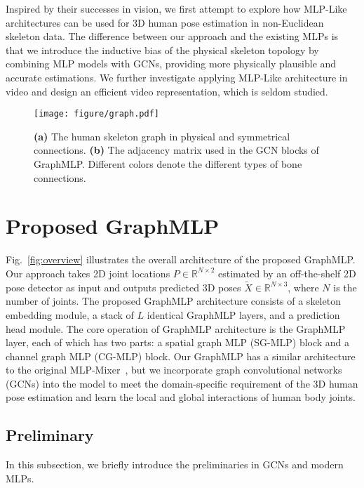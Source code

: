 \documentclass[lettersize,journal]{IEEEtran}
\begin{document}
Inspired by their successes in vision, we first attempt to explore how MLP-Like architectures can be used for 3D human pose estimation in non-Euclidean skeleton data. 
The difference between our approach and the existing MLPs is that we introduce the inductive bias of the physical skeleton topology by combining MLP models with GCNs, providing more physically plausible and accurate estimations. 
We further investigate applying MLP-Like architecture in video and design an efficient video representation, which is seldom studied. 

\begin{figure}[t]
\centering
\texttt{[image: figure/graph.pdf]}
\caption
{
\textbf{(a)} The human skeleton graph in physical and symmetrical connections. 
\textbf{(b)} The adjacency matrix used in the GCN blocks of GraphMLP. 
Different colors denote the different types of bone connections. 
}
\label{fig:graph}
\end{figure}

\section{Proposed GraphMLP}
Fig.~\ref{fig:overview} illustrates the overall architecture of the proposed GraphMLP. 
Our approach takes 2D joint locations $P \in \mathbb{R}^{N \times 2}$ estimated by an off-the-shelf 2D pose detector as input and outputs predicted 3D poses $\widetilde{X} \in \mathbb{R}^{N \times 3}$, where $N$ is the number of joints. 
The proposed GraphMLP architecture consists of a skeleton embedding module, a stack of $L$ identical GraphMLP layers, and a prediction head module. 
The core operation of GraphMLP architecture is the GraphMLP layer, each of which has two parts: a spatial graph MLP (SG-MLP) block and a channel graph MLP (CG-MLP) block. 
Our GraphMLP has a similar architecture to the original MLP-Mixer~\cite{mlpmixer}, but we incorporate graph convolutional networks (GCNs) into the model to meet the domain-specific requirement of the 3D human pose estimation and learn the local and global interactions of human body joints. 

\subsection{Preliminary}
\label{sec:preliminary}
In this subsection, we briefly introduce the preliminaries in GCNs and modern MLPs. 
\end{document}
